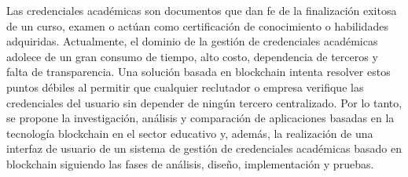 \begin{resumen}
Las credenciales académicas son documentos que dan fe de la finalización exitosa de un curso, examen o actúan como certificación de conocimiento o habilidades adquiridas. Actualmente, el dominio de la gestión de credenciales académicas adolece de un gran consumo de tiempo, alto costo, dependencia de terceros y falta de transparencia. Una solución basada en blockchain intenta resolver estos puntos débiles al permitir que cualquier reclutador o empresa verifique las credenciales del usuario sin depender de ningún tercero centralizado. Por lo tanto, se propone la investigación, análisis y comparación de aplicaciones basadas en la tecnología blockchain en el sector educativo y, además, la realización de una interfaz de usuario de un sistema de gestión de credenciales académicas basado en blockchain siguiendo las fases de análisis, diseño, implementación y pruebas.







\end{resumen}
